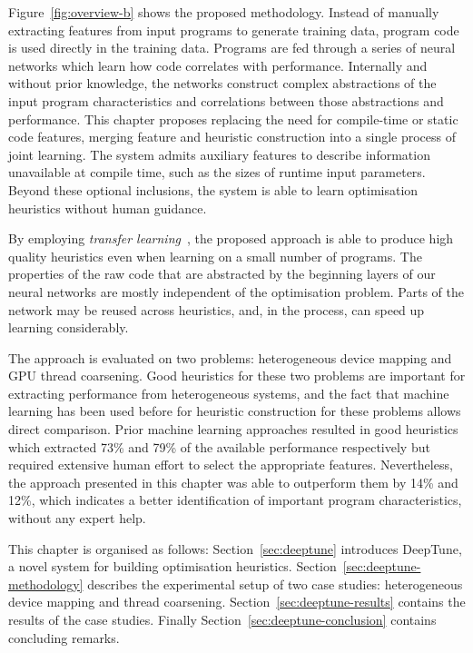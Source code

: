 Figure~\ref{fig:overview-b} shows the proposed methodology. Instead of manually extracting features from input programs to generate training data, program code is used directly in the training data. Programs are fed through a series of neural networks which learn how code correlates with performance. Internally and without prior knowledge, the networks construct complex abstractions of the input program characteristics and correlations between those abstractions and performance. This chapter proposes replacing the need for compile-time or static code features, merging feature and heuristic construction into a single process of joint learning. The system admits auxiliary features to describe information unavailable at compile time, such as the sizes of runtime input parameters. Beyond these optional inclusions, the system is able to learn optimisation heuristics without human guidance.

By employing \emph{transfer learning}~\cite{Yosinski2014}, the proposed approach is able to produce high quality heuristics even when learning on a small number of programs. The properties of the raw code that are abstracted by the beginning layers of our neural networks are mostly independent of the optimisation problem. Parts of the network may be reused across heuristics, and, in the process, can speed up learning considerably.

The approach is evaluated on two problems: heterogeneous device mapping and GPU thread coarsening. Good heuristics for these two problems are important for extracting performance from heterogeneous systems, and the fact that machine learning has been used before for heuristic construction for these problems allows direct comparison. Prior machine learning approaches resulted in good heuristics which extracted 73\% and 79\% of the available performance respectively but required extensive human effort to select the appropriate features. Nevertheless, the approach presented in this chapter was able to outperform them by 14\% and 12\%, which indicates a better identification of important program characteristics, without any expert help.

This chapter is organised as follows: Section~\ref{sec:deeptune} introduces DeepTune, a novel system for building optimisation heuristics. Section~\ref{sec:deeptune-methodology} describes the experimental setup of two case studies: heterogeneous device mapping and thread coarsening. Section~\ref{sec:deeptune-results} contains the results of the case studies. Finally Section~\ref{sec:deeptune-conclusion} contains concluding remarks.